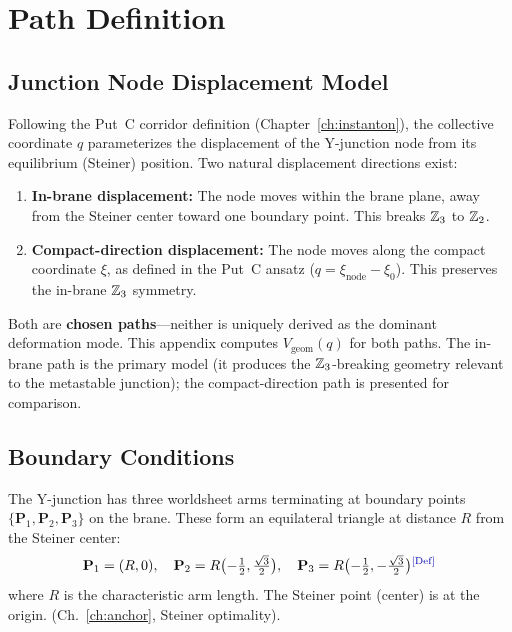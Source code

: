 \section{Path Definition}
\label{sec:vq:path}

\subsection{Junction Node Displacement Model}

Following the Put~C corridor definition
(Chapter~\ref{ch:instanton}), the collective coordinate $q$ parameterizes
the displacement of the Y-junction node from its equilibrium (Steiner)
position. Two natural displacement directions exist:

\begin{enumerate}
    \item \textbf{In-brane displacement:} The node moves within the brane
          plane, away from the Steiner center toward one boundary point. This
          breaks $\mathbb{Z}_3$ to $\mathbb{Z}_2$.
    \item \textbf{Compact-direction displacement:} The node moves along the
          compact coordinate $\xi$, as defined in the Put~C ansatz
          ($q = \xi_{\mathrm{node}} - \xi_0$). This preserves the in-brane
          $\mathbb{Z}_3$ symmetry.
\end{enumerate}

Both are \textbf{chosen paths}---neither is uniquely derived as the dominant
deformation mode. This appendix computes $V_{\mathrm{geom}}(q)$ for both
paths. The in-brane path is the primary model (it produces the
$\mathbb{Z}_3$-breaking geometry relevant to the metastable junction); the
compact-direction path is presented for comparison.

\subsection{Boundary Conditions}

The Y-junction has three worldsheet arms terminating at boundary points
$\{\mathbf{P}_1, \mathbf{P}_2, \mathbf{P}_3\}$ on the brane. These form
an equilateral triangle at distance $R$ from the Steiner center:
\begin{equation}
    \mathbf{P}_1 = (R, 0), \quad
    \mathbf{P}_2 = R\bigl(-\tfrac{1}{2}, \tfrac{\sqrt{3}}{2}\bigr), \quad
    \mathbf{P}_3 = R\bigl(-\tfrac{1}{2}, -\tfrac{\sqrt{3}}{2}\bigr)
    \label{eq:boundary_points}
    \tagDef
\end{equation}
where $R$ is the characteristic arm length. The Steiner point (center)
is at the origin. \tagDer{} (Ch.~\ref{ch:anchor}, Steiner optimality).

